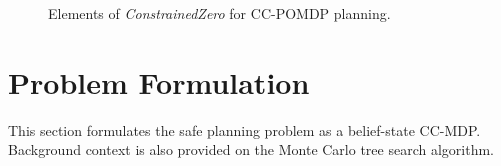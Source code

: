 \begin{figure}[h!]
    \centering
    \caption{Elements of \textit{ConstrainedZero} for CC-POMDP planning.}
    \label{fig:cz-alg}
    \vspace*{-4mm}
\end{figure}


\section{Problem Formulation}
This section formulates the safe planning problem as a belief-state CC-MDP.
Background context is also provided on the Monte Carlo tree search algorithm.

